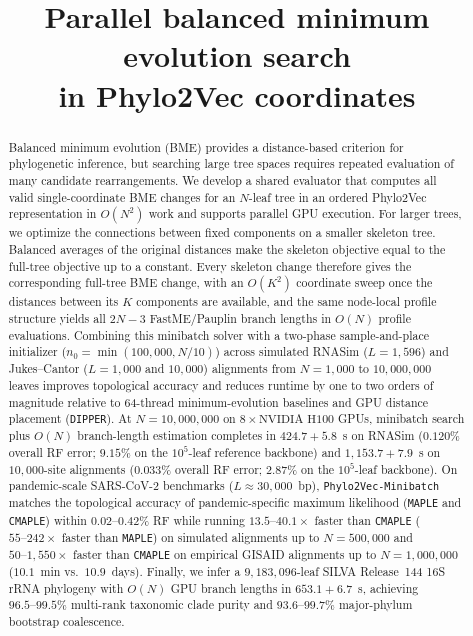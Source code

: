 \documentclass[11pt,a4paper]{article}
\title{Parallel balanced minimum evolution search\\in Phylo2Vec coordinates}
\author{}
\date{}
\makeatletter
\DeclareRobustCommand{\_}{\ifmmode\nfss@text{\textunderscore}\else\textunderscore\allowbreak\fi}
\theoremstyle{definition}
\makeatother
\begin{document}
\maketitle

\begin{abstract}
Balanced minimum evolution (BME) provides a distance-based criterion for phylogenetic inference, but searching large tree spaces requires repeated evaluation of many candidate rearrangements.
We develop a shared evaluator that computes all valid single-coordinate BME changes for an $N$-leaf tree in an ordered Phylo2Vec representation in $O(N^2)$ work and supports parallel GPU execution.
For larger trees, we optimize the connections between fixed components on a smaller skeleton tree.
Balanced averages of the original distances make the skeleton objective equal to the full-tree objective up to a constant.
Every skeleton change therefore gives the corresponding full-tree BME change, with an $O(K^2)$ coordinate sweep once the distances between its $K$ components are available, and the same node-local profile structure yields all $2N-3$ FastME/Pauplin branch lengths in $O(N)$ profile evaluations.
Combining this minibatch solver with a two-phase sample-and-place initializer ($n_0=\min(100{,}000,N/10)$) across simulated RNASim ($L=1{,}596$) and Jukes--Cantor ($L=1{,}000$ and $10{,}000$) alignments from $N=1{,}000$ to $10{,}000{,}000$ leaves improves topological accuracy and reduces runtime by one to two orders of magnitude relative to 64-thread minimum-evolution baselines and GPU distance placement (\texttt{DIPPER}).
At $N=10{,}000{,}000$ on $8\times\text{NVIDIA H100}$ GPUs, minibatch search plus $O(N)$ branch-length estimation completes in $424.7+5.8$~s on RNASim ($0.120\%$ overall RF error; $9.15\%$ on the $10^5$-leaf reference backbone) and $1{,}153.7+7.9$~s on $10{,}000$-site alignments ($0.033\%$ overall RF error; $2.87\%$ on the $10^5$-leaf backbone).
On pandemic-scale SARS-CoV-2 benchmarks ($L\approx30{,}000$~bp), \texttt{Phylo2Vec-Minibatch} matches the topological accuracy of pandemic-specific maximum likelihood (\texttt{MAPLE} and \texttt{CMAPLE}) within $0.02\text{--}0.42\%$ RF while running $13.5\text{--}40.1\times$ faster than \texttt{CMAPLE} ($55\text{--}242\times$ faster than \texttt{MAPLE}) on simulated alignments up to $N=500{,}000$ and $50\text{--}1{,}550\times$ faster than \texttt{CMAPLE} on empirical GISAID alignments up to $N=1{,}000{,}000$ ($10.1$~min vs.\ $10.9$~days).
Finally, we infer a $9{,}183{,}096$-leaf SILVA Release~144 16S rRNA phylogeny with $O(N)$ GPU branch lengths in $653.1+6.7$~s, achieving $96.5\text{--}99.5\%$ multi-rank taxonomic clade purity and $93.6\text{--}99.7\%$ major-phylum bootstrap coalescence.
\end{abstract}
\end{document}
